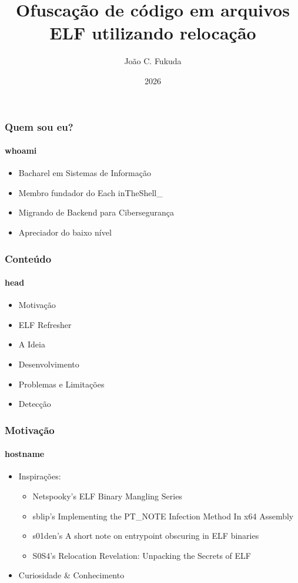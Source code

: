 \documentclass[portuguese]{beamer}
\title{Ofuscação de código em arquivos ELF utilizando relocação}
\author{João C. Fukuda}
\institute{Cryptorave}
\date{2026}
\begin{document}
\frame{\titlepage}

\begin{frame}
	\frametitle{Quem sou eu?}
	\framesubtitle{whoami}
	\begin{itemize}
		\item Bacharel em Sistemas de Informação
		\item Membro fundador do Each inTheShell\_
		\item Migrando de Backend para Cibersegurança
		\item Apreciador do baixo nível
	\end{itemize}
\end{frame}

\begin{frame}
	\frametitle{Conteúdo}
	\framesubtitle{head}
	\begin{itemize}
		\item Motivação
		\item ELF Refresher
		\item A Ideia
		\item Desenvolvimento
		\item Problemas e Limitações
		\item Detecção
	\end{itemize}
\end{frame}

\begin{frame}
	\frametitle{Motivação}
	\framesubtitle{hostname}
	\begin{itemize}
		\item Inspirações:
		\begin{itemize}
			\item Netspooky's ELF Binary Mangling Series\cite{netspooky}
			\item sblip's Implementing the PT\_NOTE Infection Method In x64 Assembly\cite{sblip}
			\item s01den's A short note on entrypoint obscuring in ELF binaries\cite{s01den}
			\item S0S4's Relocation Revelation: Unpacking the Secrets of ELF\cite{s0s4}
		\end{itemize}
		\item Curiosidade \& Conhecimento
	\end{itemize}
\end{frame}
\end{document}
